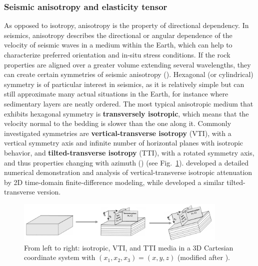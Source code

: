 \subsubsection{Seismic anisotropy and elasticity tensor}
As opposed to isotropy, anisotropy is the property of directional dependency. In seismics, anisotropy describes the directional or angular dependence of the velocity of seismic waves in a medium within the Earth, which can help to characterize preferred orientation and in-situ stress conditions. If the rock properties are aligned over a greater volume extending several wavelengths, they can create certain symmetries of seismic anisotropy (\cite{Thomsen:86}). Hexagonal (or cylindrical) symmetry is of particular interest in seismics, as it is relatively simple but can still approximate many actual situations in the Earth, for instance where sedimentary layers are neatly ordered. The most typical anisotropic medium that exhibits hexagonal symmetry is \textbf{transversely isotropic}, which means that the velocity normal to the bedding is slower than the one along it. Commonly investigated symmetries are \textbf{vertical-transverse isotropy} (VTI), with a vertical symmetry axis and infinite number of horizontal planes with isotropic behavior, and \textbf{tilted-transverse isotropy} (TTI), with a rotated symmetry axis, and thus properties changing with azimuth (\cite{Tsvankin:12}) (see Fig.~\ref{fig:tti}). \citet{Bai:16} developed a detailed numerical demonstration and analysis of vertical-transverse isotropic attenuation by 2D time-domain finite-difference modeling, while \citet{Oh:20} developed a similar tilted-transverse version. 
\begin{figure}[h!]
    \centering
    \includegraphics[width=0.9\textwidth]{figures/tti.png}
    \caption{From left to right: isotropic, VTI, and TTI media in a 3D Cartesian coordinate system with $(x_1,x_2,x_3) = (x,y,z)$ (modified after \cite{TGSwebsite}).}
    \label{fig:tti}
\end{figure}

